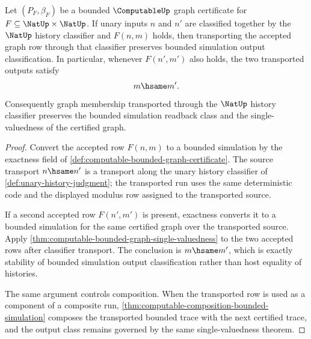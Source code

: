 \begin{theorem}
\label{thm:computable-bounded-graph-classifier-stability-obligation}
Let $(P_F,\beta_F)$ be a bounded $\ComputableUp$ graph certificate for $F\subseteq\NatUp\times\NatUp$. If unary inputs $n$ and $n'$ are classified together by the $\NatUp$ history classifier and $F(n,m)$ holds, then transporting the accepted graph row through that classifier preserves bounded simulation output classification. In particular, whenever $F(n',m')$ also holds, the two transported outputs satisfy
$$
  m\hsame m'.
$$
Consequently graph membership transported through the $\NatUp$ history classifier preserves the bounded simulation readback class and the single-valuedness of the certified graph.
\end{theorem}
\begin{proof}
Convert the accepted row $F(n,m)$ to a bounded simulation by the exactness field of \autoref{def:computable-bounded-graph-certificate}. The source transport $n\hsame n'$ is a transport along the unary history classifier of \autoref{def:unary-history-judgment}; the transported run uses the same deterministic code and the displayed modulus row assigned to the transported source.

If a second accepted row $F(n',m')$ is present, exactness converts it to a bounded simulation for the same certified graph over the transported source. Apply \autoref{thm:computable-bounded-graph-single-valuedness} to the two accepted rows after classifier transport. The conclusion is $m\hsame m'$, which is exactly stability of bounded simulation output classification rather than host equality of histories.

The same argument controls composition. When the transported row is used as a component of a composite run, \autoref{thm:computable-composition-bounded-simulation} composes the transported bounded trace with the next certified trace, and the output class remains governed by the same single-valuedness theorem.
\end{proof}

